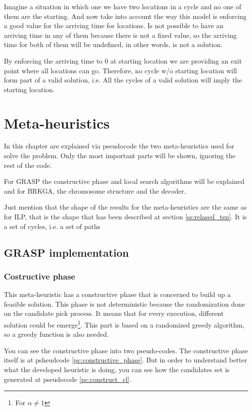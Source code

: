 \documentclass[]{report}
\begin{document}
Imagine a situation in which one we have two locations in a cycle and no one of them are the starting. And now take into account the way this model is enforcing a good value for the arriving time for locations. Is not possible to have an arriving time in any of them because there is not a fixed value, so the arriving time for both of them will be undefined, in other words, is not a solution.

By enforcing the arriving time to $0$ at starting location we are providing an exit point where all locations can go. Therefore, no cycle w/o starting location will form part of a valid solution, i.e. All the cycles of a valid solution will imply the starting location.

\chapter{Meta-heuristics}\label{ch:meta_heuristics}

In this chapter are explained via pseudocode the two meta-heuristics used for solve the problem. Only the most important parts will be shown, ignoring the rest of the code.

For GRASP the constructive phase and local search algorithms will be explained and for BRKGA, the chromosome structure and the decoder.

Just mention that the shape of the results for the meta-heuristics are the same as for ILP, that is the shape that has been described at section \ref{ss:relased_tsp}. It is a set of cycles, i.e. a set of paths

\section{GRASP implementation}
\subsection{Costructive phase}
This meta-heuristic has a constructive phase that is concerned to build up a feasible solution. This phase is not deterministic because the randomization done on the candidate pick process. It means that for every execution, different solution could be emerge\footnote{For $\alpha \neq 1$}. This part is based on a randomized greedy algorithm, so a greedy function is also needed.

You can see the constructive phase into two pseudo-codes. The constructive phase itself is at psheudcode \ref{pc:constructive_phase}. But in order to understand better what the developed heuristic is doing, you can see how the candidates set is generated at pseudocode \ref{pc:construct_cl}.
\end{document}
